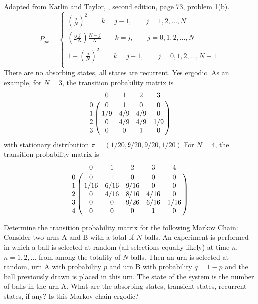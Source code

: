 \documentclass[12pt]{article}
\begin{document}
\begin{solution}
    Adapted from Karlin and Taylor, , second edition, page 73, problem 1(b).
    \[
        P_{jk} =
        \begin{cases}
            (\frac{j}{N})^2 \qquad k = j-1, \qquad j=1,2,\dots,N \\
            (2\frac{j}{N})\frac{N-j}{N} \qquad k = j, \qquad j=0,1,2,\dots,N
            \\
            1- (\frac{j}{N})^2 \qquad k = j-1, \qquad j=0,1,2,\dots,N-1
            \\
        \end{cases}
    \] There are no absorbing states, all states are recurrent.  Yes
    ergodic. As an example, for \( N = 3 \), the transition probability
    matrix is
    \[
        \bordermatrix{ & 0 & 1 & 2 & 3 \cr
        0 & 0 & 1 & 0 & 0 \cr
        1 & 1/9 & 4/9 & 4/9 & 0 \cr
        2 & 0 & 4/9 & 4/9 & 1/9 \cr
        3 & 0 & 0 & 1 & 0 }
    \] with stationary distribution \( \pi = (1/20, 9/20, 9/20, 1/20) \)
    For \( N = 4 \), the transition probability matrix is
    \[
        \bordermatrix{ & 0 & 1 & 2 & 3 & 4 \cr
        0 & 0 & 1 & 0 & 0 & 0 \cr
        1 & 1/16& 6/16& 9/16& 0 & 0 \cr
        2 & 0 & 4/16& 8/16& 4/16 & 0 \cr
        3 & 0 & 0 & 9/26& 6/16 & 1/16 \cr
        4 & 0 & 0 & 0 & 1 & 0 }
    \]
\end{solution}
\begin{exercise}
    Determine the transition probability matrix for the following Markov
    Chain:  Consider two urns A and B with a total of \( N \) balls.  An
    experiment is performed in which a ball is selected at random (all
    selections equally likely) at time \( n \), \( n=1,2,\dots \) from
    among the totality of \( N \) balls.  Then an urn is selected at
    random, urn A with probability \( p \) and urn B with probability \(
    q = 1- p \) and the ball previously drawn is placed in this urn.
    The state of the system is the number of balls in the urn A. What
    are the absorbing states, transient states, recurrent states, if
    any?  Is this Markov chain ergodic?
\end{exercise}
\end{document}
